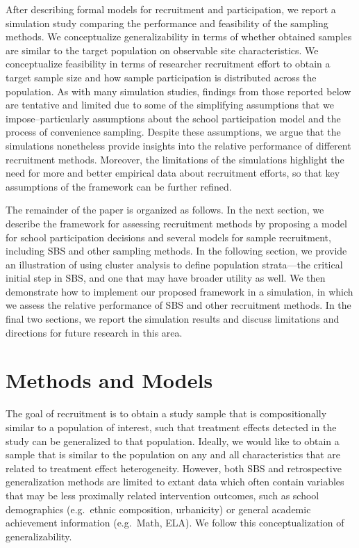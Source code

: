 \documentclass[english,man,floatsintext]{apa6}
\begin{document}
After describing formal models for recruitment and participation, we report a simulation study comparing the performance and feasibility of the sampling methods. We conceptualize generalizability in terms of whether obtained samples are similar to the target population on observable site characteristics. We conceptualize
feasibility in terms of researcher recruitment effort to obtain a target sample size and how sample participation is distributed across the population.
As with many simulation studies, findings from those reported below are tentative and limited due to some of the simplifying assumptions that we impose--particularly assumptions about the school participation model and the process of convenience sampling.
Despite these assumptions, we argue that the simulations nonetheless provide insights into the relative performance of different recruitment methods.
Moreover, the limitations of the simulations highlight the need for more and better empirical data about recruitment efforts, so that key assumptions of the framework can be further refined.

The remainder of the paper is organized as follows. In the next section, we describe the framework for assessing recruitment methods by proposing a model for school participation decisions and several models for sample recruitment, including SBS and other sampling methods. In the following section, we provide an illustration of using cluster analysis to define population strata---the critical initial step in SBS, and one that may have broader utility as well. We then demonstrate how to implement our proposed framework in a simulation, in which we assess the relative performance of SBS and other recruitment methods. In the final two sections, we report the simulation results and discuss limitations and directions for future research in this area.

\hypertarget{methods-and-models}{%
\section{Methods and Models}\label{methods-and-models}}

The goal of recruitment is to obtain a study sample that is compositionally similar to a population of interest, such that treatment effects detected in the study can be generalized to that population.
Ideally, we would like to obtain a sample that is similar to the population on any and all characteristics that are related to treatment effect heterogeneity.
However, both SBS and retrospective generalization methods are limited to extant data which often contain variables that may be less proximally related intervention outcomes, such as school demographics (e.g.~ethnic composition, urbanicity) or general academic achievement information (e.g.~Math, ELA).
We follow this conceptualization of generalizability.
\end{document}
